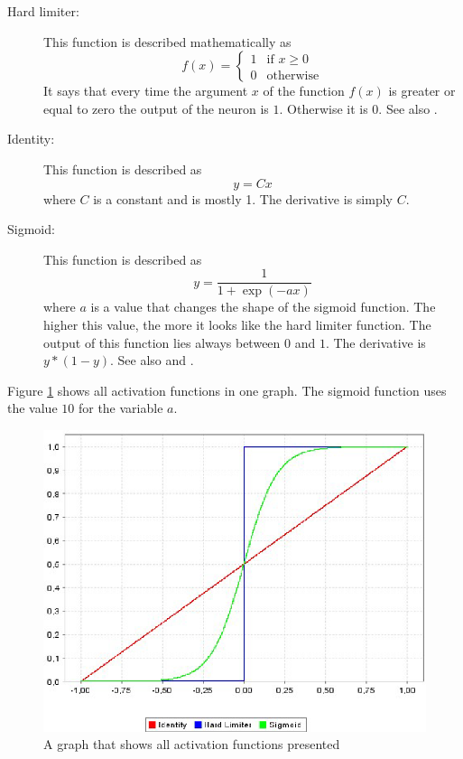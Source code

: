 \begin{description}
	\item[Hard limiter:] This function is described mathematically as
\begin{equation}	f(x) =
	\begin{cases}
		1 & \text{if } x \ge 0 \\
		0 & \text{otherwise}
	\end{cases}
\end{equation}
It says that every time the argument $x$ of the function $f(x)$ is greater or equal to zero the output of the neuron is $1$. Otherwise it is $0$. See also \cite[p.178]{pattern}.

	\item[Identity:] This function is described as
\begin{equation} y = Cx \end{equation}
where $C$ is a constant and is mostly 1. The derivative is simply $C$.

	\item[Sigmoid:] This function is described as \begin{equation} y = \frac{1}{1+\exp(-ax)} \end{equation}
where $a$ is a value that changes the shape of the sigmoid function. The higher this value, the more it looks like the hard limiter function. The output of this function lies always between $0$ and $1$. The derivative is $y * (1 - y)$. See also \cite[p.149f]{neuralnetworks} and \cite[p.184]{pattern}.

\end{description}

Figure \ref{activation} shows all activation functions in one graph. The sigmoid function uses the value $10$ for the variable $a$.

\begin{figure}[htbp]
	\begin{center}
		\includegraphics[width=0.55\columnwidth]{graphics/Activation}
	\end{center}
	\vspace{-1em}
	\caption{A graph that shows all activation functions presented}
	\label{activation}
\end{figure}

